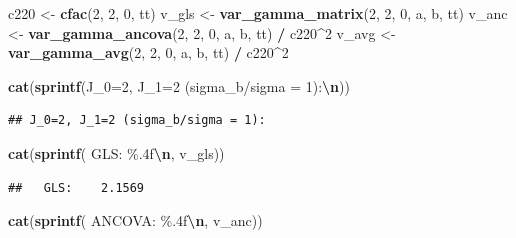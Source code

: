 \documentclass[
  11pt,
]{article}
\newenvironment{Shaded}{\begin{snugshade}}{\end{snugshade}}
\newcommand{\DecValTok}[1]{\textcolor[rgb]{0.00,0.00,0.81}{#1}}
\newcommand{\FunctionTok}[1]{\textcolor[rgb]{0.13,0.29,0.53}{\textbf{#1}}}
\newcommand{\NormalTok}[1]{#1}
\newcommand{\OtherTok}[1]{\textcolor[rgb]{0.56,0.35,0.01}{#1}}
\newcommand{\SpecialCharTok}[1]{\textcolor[rgb]{0.81,0.36,0.00}{\textbf{#1}}}
\newcommand{\StringTok}[1]{\textcolor[rgb]{0.31,0.60,0.02}{#1}}
\begin{document}
\begin{Shaded}
\begin{Highlighting}[]
\NormalTok{c220 }\OtherTok{\textless{}{-}} \FunctionTok{cfac}\NormalTok{(}\DecValTok{2}\NormalTok{, }\DecValTok{2}\NormalTok{, }\DecValTok{0}\NormalTok{, tt)}
\NormalTok{v\_gls }\OtherTok{\textless{}{-}} \FunctionTok{var\_gamma\_matrix}\NormalTok{(}\DecValTok{2}\NormalTok{, }\DecValTok{2}\NormalTok{, }\DecValTok{0}\NormalTok{, a, b, tt)}
\NormalTok{v\_anc }\OtherTok{\textless{}{-}} \FunctionTok{var\_gamma\_ancova}\NormalTok{(}\DecValTok{2}\NormalTok{, }\DecValTok{2}\NormalTok{, }\DecValTok{0}\NormalTok{, a, b, tt) }\SpecialCharTok{/}\NormalTok{ c220}\SpecialCharTok{\^{}}\DecValTok{2}
\NormalTok{v\_avg }\OtherTok{\textless{}{-}} \FunctionTok{var\_gamma\_avg}\NormalTok{(}\DecValTok{2}\NormalTok{, }\DecValTok{2}\NormalTok{, }\DecValTok{0}\NormalTok{, a, b, tt) }\SpecialCharTok{/}\NormalTok{ c220}\SpecialCharTok{\^{}}\DecValTok{2}

\FunctionTok{cat}\NormalTok{(}\FunctionTok{sprintf}\NormalTok{(}\StringTok{\textquotesingle{}J\_0=2, J\_1=2 (sigma\_b/sigma = 1):}\SpecialCharTok{\textbackslash{}n}\StringTok{\textquotesingle{}}\NormalTok{))}
\end{Highlighting}
\end{Shaded}

\begin{verbatim}
## J_0=2, J_1=2 (sigma_b/sigma = 1):
\end{verbatim}

\begin{Shaded}
\begin{Highlighting}[]
\FunctionTok{cat}\NormalTok{(}\FunctionTok{sprintf}\NormalTok{(}\StringTok{\textquotesingle{}  GLS:    \%.4f}\SpecialCharTok{\textbackslash{}n}\StringTok{\textquotesingle{}}\NormalTok{, v\_gls))}
\end{Highlighting}
\end{Shaded}

\begin{verbatim}
##   GLS:    2.1569
\end{verbatim}

\begin{Shaded}
\begin{Highlighting}[]
\FunctionTok{cat}\NormalTok{(}\FunctionTok{sprintf}\NormalTok{(}\StringTok{\textquotesingle{}  ANCOVA: \%.4f}\SpecialCharTok{\textbackslash{}n}\StringTok{\textquotesingle{}}\NormalTok{, v\_anc))}
\end{Highlighting}
\end{Shaded}
\end{document}
